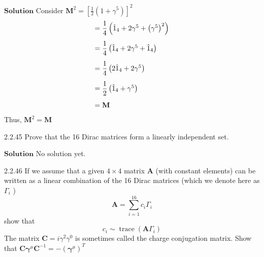 \documentclass{styles/kaobook}
\begin{document}
$\boxed{\textbf{Solution}}$ Consider $\mathbf{M}^{2}=\left[\frac{1}{2}\left(1+\gamma^{5}\right)\right]^{2}$
$$
\begin{array}{l}
=\dfrac{1}{4}\left(\hat{1}_{4}+2 \gamma^{5}+\left(\gamma^{5}\right)^{2}\right)\vspace{3mm} \\
=\dfrac{1}{4}\left(\hat{1}_{4}+2 \gamma^{5}+\hat{1}_{4}\right) \vspace{3mm}\\
=\dfrac{1}{4}\left(2\hat{1}_{4}+2 \gamma^{5}\right) \vspace{3mm}\\
=\dfrac{1}{2}\left(\hat{1}_{4}+\gamma^{5}\right) \vspace{3mm}\\
=\mathbf{M}
\end{array}
$$
Thus, $\mathbf{M}^2 = \mathbf{M}$
 

\begin{greenbox}{2.2.45}
Prove that the 16 Dirac matrices form a linearly independent set.
\end{greenbox}


$\boxed{\textbf{Solution}}$ No solution yet.

\newpage

\begin{greenbox}{2.2.46}
If we assume that a given $4 \times 4$ matrix $\mathbf{A}$ (with constant elements) can be written as a linear combination of the 16 Dirac matrices (which we denote here as $\Gamma_{i}$ )
$$
\mathbf{A}=\sum_{i=1}^{16} c_{i} \Gamma_{i}
$$
show that
$$
c_{i} \sim \operatorname{trace}\left(\mathbf{A} \Gamma_{i}\right)
$$
The matrix $\mathbf{C}=i \gamma^{2} \gamma^{0}$ is sometimes called the charge conjugation matrix. Show that $\mathbf{C} \boldsymbol{\gamma}^{\mu} \mathbf{C}^{-1}=-\left(\boldsymbol{\gamma}^{\mu}\right)^{T}$
\end{greenbox}
\end{document}
